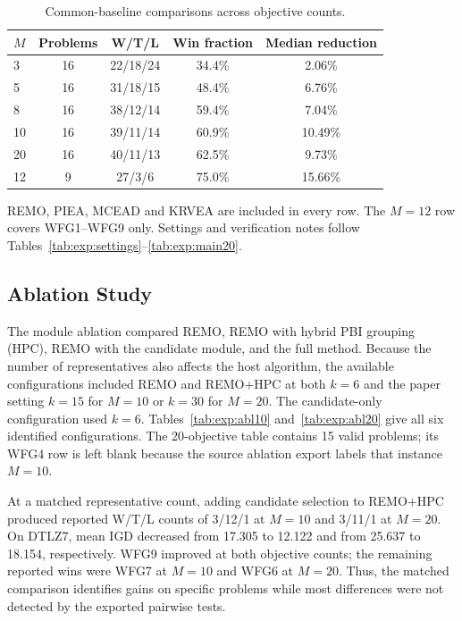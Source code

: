 \documentclass[final,5p,times,twocolumn]{elsarticle}
\begin{document}
\begin{table}[t]
\centering
\caption{Common-baseline comparisons across objective counts.}
\label{tab:exp:objectives}
\scriptsize
\setlength{\tabcolsep}{2.5pt}
\renewcommand{\arraystretch}{1.12}
\begin{tabular}{lcccc}
\toprule
$M$ & Problems & W/T/L & Win fraction & Median reduction \\
\midrule
3 & 16 & 22/18/24 & 34.4\% & 2.06\% \\
5 & 16 & 31/18/15 & 48.4\% & 6.76\% \\
8 & 16 & 38/12/14 & 59.4\% & 7.04\% \\
10 & 16 & 39/11/14 & 60.9\% & 10.49\% \\
20 & 16 & 40/11/13 & 62.5\% & 9.73\% \\
\midrule
12 & 9 & 27/3/6 & 75.0\% & 15.66\% \\
\bottomrule
\end{tabular}
\par\smallskip
\begin{minipage}{\linewidth}
\scriptsize REMO, PIEA, MCEAD and KRVEA are included in every row. The $M=12$ row covers WFG1--WFG9 only. Settings and verification notes follow Tables~\ref{tab:exp:settings}--\ref{tab:exp:main20}.
\end{minipage}
\end{table}

\subsection{Ablation Study}
\label{sec:exp:ablation}

The module ablation compared REMO, REMO with hybrid PBI grouping (HPC),
REMO with the candidate module, and the full method. Because the number
of representatives also affects the host algorithm, the available
configurations included REMO and REMO+HPC at both $k=6$ and the paper
setting $k=15$ for $M=10$ or $k=30$ for $M=20$. The candidate-only
configuration used $k=6$. Tables~\ref{tab:exp:abl10}
and~\ref{tab:exp:abl20} give all six identified configurations. The
20-objective table contains 15 valid problems; its WFG4 row is left blank
because the source ablation export labels that instance $M=10$.

At a matched representative count, adding candidate selection to
REMO+HPC produced reported W/T/L counts of 3/12/1 at $M=10$ and 3/11/1
at $M=20$. On DTLZ7, mean IGD decreased from 17.305 to 12.122 and from
25.637 to 18.154, respectively. WFG9 improved at both objective counts;
the remaining reported wins were WFG7 at $M=10$ and WFG6 at $M=20$.
Thus, the matched comparison identifies gains on specific problems while
most differences were not detected by the exported pairwise tests.
\end{document}
